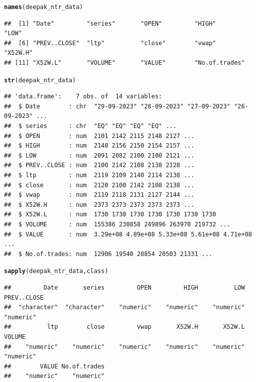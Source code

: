 \documentclass[11pt, a4paper]{article}\usepackage[]{graphicx}\usepackage[]{xcolor}
\makeatletter
\newcommand{\hlstd}[1]{\textcolor[rgb]{0.345,0.345,0.345}{#1}}%
\newcommand{\hlkwd}[1]{\textcolor[rgb]{0.737,0.353,0.396}{\textbf{#1}}}%
\newenvironment{kframe}{%
 \def\at@end@of@kframe{}%
 \ifinner\ifhmode%
  \def\at@end@of@kframe{\end{minipage}}%
  \begin{minipage}{\columnwidth}%
 \fi\fi%
 \def\FrameCommand##1{\hskip\@totalleftmargin \hskip-\fboxsep
 \colorbox{shadecolor}{##1}\hskip-\fboxsep
     \hskip-\linewidth \hskip-\@totalleftmargin \hskip\columnwidth}%
 \MakeFramed {\advance\hsize-\width
   \@totalleftmargin\z@ \linewidth\hsize
   \@setminipage}}%
 {\par\unskip\endMakeFramed%
 \at@end@of@kframe}
\newenvironment{knitrout}{}{} %
\makeatother
\begin{document}
\begin{knitrout}
\color{fgcolor}\begin{kframe}
\begin{alltt}
\hlkwd{names}\hlstd{(deepak_ntr_data)}
\end{alltt}
\begin{verbatim}
##  [1] "Date"         "series"       "OPEN"         "HIGH"         "LOW"         
##  [6] "PREV..CLOSE"  "ltp"          "close"        "vwap"         "X52W.H"      
## [11] "X52W.L"       "VOLUME"       "VALUE"        "No.of.trades"
\end{verbatim}
\end{kframe}
\end{knitrout}

\begin{knitrout}
\color{fgcolor}\begin{kframe}
\begin{alltt}
\hlkwd{str}\hlstd{(deepak_ntr_data)}
\end{alltt}
\begin{verbatim}
## 'data.frame':	7 obs. of  14 variables:
##  $ Date        : chr  "29-09-2023" "28-09-2023" "27-09-2023" "26-09-2023" ...
##  $ series      : chr  "EQ" "EQ" "EQ" "EQ" ...
##  $ OPEN        : num  2101 2142 2115 2148 2127 ...
##  $ HIGH        : num  2140 2156 2150 2154 2157 ...
##  $ LOW         : num  2091 2082 2100 2100 2121 ...
##  $ PREV..CLOSE : num  2100 2142 2108 2138 2128 ...
##  $ ltp         : num  2119 2109 2140 2114 2138 ...
##  $ close       : num  2120 2100 2142 2108 2138 ...
##  $ vwap        : num  2119 2118 2131 2127 2144 ...
##  $ X52W.H      : num  2373 2373 2373 2373 2373 ...
##  $ X52W.L      : num  1730 1730 1730 1730 1730 1730 1730
##  $ VOLUME      : num  155386 230858 249896 263970 219732 ...
##  $ VALUE       : num  3.29e+08 4.89e+08 5.33e+08 5.61e+08 4.71e+08 ...
##  $ No.of.trades: num  12906 19540 20854 20503 21331 ...
\end{verbatim}
\end{kframe}
\end{knitrout}


\begin{knitrout}
\color{fgcolor}\begin{kframe}
\begin{alltt}
\hlkwd{sapply}\hlstd{(deepak_ntr_data, class)}
\end{alltt}
\begin{verbatim}
##         Date       series         OPEN         HIGH          LOW  PREV..CLOSE 
##  "character"  "character"    "numeric"    "numeric"    "numeric"    "numeric" 
##          ltp        close         vwap       X52W.H       X52W.L       VOLUME 
##    "numeric"    "numeric"    "numeric"    "numeric"    "numeric"    "numeric" 
##        VALUE No.of.trades 
##    "numeric"    "numeric"
\end{verbatim}
\end{kframe}
\end{knitrout}
\end{document}
